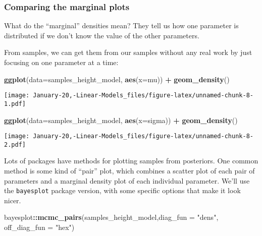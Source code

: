 \documentclass[]{article}
\newenvironment{Shaded}{\begin{snugshade}}{\end{snugshade}}
\newcommand{\DataTypeTok}[1]{\textcolor[rgb]{0.13,0.29,0.53}{#1}}
\newcommand{\KeywordTok}[1]{\textcolor[rgb]{0.13,0.29,0.53}{\textbf{#1}}}
\newcommand{\NormalTok}[1]{#1}
\newcommand{\OperatorTok}[1]{\textcolor[rgb]{0.81,0.36,0.00}{\textbf{#1}}}
\newcommand{\StringTok}[1]{\textcolor[rgb]{0.31,0.60,0.02}{#1}}
\begin{document}
\hypertarget{comparing-the-marginal-plots}{%
\subsubsection{Comparing the marginal
plots}\label{comparing-the-marginal-plots}}

What do the ``marginal'' densities mean? They tell us how one parameter
is distributed if we don't know the value of the other parameters.

From samples, we can get them from our samples without any real work by
just focusing on one parameter at a time:

\begin{Shaded}
\begin{Highlighting}[]
\KeywordTok{ggplot}\NormalTok{(}\DataTypeTok{data=}\NormalTok{samples_height_model, }\KeywordTok{aes}\NormalTok{(}\DataTypeTok{x=}\NormalTok{mu)) }\OperatorTok{+}\StringTok{ }
\StringTok{  }\KeywordTok{geom_density}\NormalTok{() }
\end{Highlighting}
\end{Shaded}

\texttt{[image: January-20,-Linear-Models\_files/figure-latex/unnamed-chunk-8-1.pdf]}

\begin{Shaded}
\begin{Highlighting}[]
\KeywordTok{ggplot}\NormalTok{(}\DataTypeTok{data=}\NormalTok{samples_height_model, }\KeywordTok{aes}\NormalTok{(}\DataTypeTok{x=}\NormalTok{sigma)) }\OperatorTok{+}\StringTok{ }
\StringTok{  }\KeywordTok{geom_density}\NormalTok{() }
\end{Highlighting}
\end{Shaded}

\texttt{[image: January-20,-Linear-Models\_files/figure-latex/unnamed-chunk-8-2.pdf]}

Lots of packages have methods for plotting samples from posteriors. One
common method is some kind of ``pair'' plot, which combines a scatter
plot of each pair of parameters and a marginal density plot of each
individual parameter. We'll use the \texttt{bayesplot} package version,
with some specific options that make it look nicer.

\begin{Shaded}
\begin{Highlighting}[]
\NormalTok{bayesplot}\OperatorTok{::}\KeywordTok{mcmc_pairs}\NormalTok{(samples_height_model,}\DataTypeTok{diag_fun =} \StringTok{"dens"}\NormalTok{,}
  \DataTypeTok{off_diag_fun =}  \StringTok{"hex"}\NormalTok{) }
\end{Highlighting}
\end{Shaded}
\end{document}
